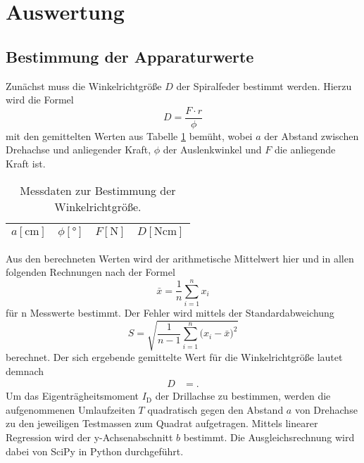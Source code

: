 \section{Auswertung}
\label{sec:Auswertung}

\subsection{Bestimmung der Apparaturwerte}

Zunächst muss die Winkelrichtgröße $D$ der Spiralfeder bestimmt werden.
Hierzu wird die Formel
\begin{equation}
  D = \frac{F \cdot r}{\phi}
\end{equation}
mit den gemittelten Werten aus Tabelle \ref{tab:1} bemüht, wobei $a$ der Abstand zwischen Drehachse und anliegender Kraft, $\phi$ der Auslenkwinkel und $F$ die anliegende Kraft ist.

\begin{table}[H]
  \centering
  \caption{Messdaten zur Bestimmung der Winkelrichtgröße.}
  \label{tab:1}
  \begin{tabular}{c c c c}
    \toprule
    {$a [\si{\centi\metre}]$} & {$\phi [\si{\degree}]$} & {$F [\si{\newton}]$} & {$D [\si{\newton\centi\metre}]$}\\
    \midrule
    
    \bottomrule
  \end{tabular}
\end{table}

Aus den berechneten Werten wird der arithmetische Mittelwert hier und in allen folgenden Rechnungen nach der Formel
\begin{equation}
  \bar{x} = \frac{1}{n} \sum_{i=1}^n x_i
\end{equation}
für n Messwerte bestimmt.
Der Fehler wird mittels der Standardabweichung
\begin{equation}
  S = \sqrt{ \frac{1}{n-1} \sum_{i=1}^n  \bigl(x_i - \bar{x} \bigr)^2  }
\end{equation}
berechnet.
Der sich ergebende gemittelte Wert für die Winkelrichtgröße lautet demnach
\begin{align*}
  D   &=   .
\end{align*}
Um das Eigenträgheitsmoment $I_{\text{D}}$ der Drillachse zu bestimmen, werden die aufgenommenen Umlaufzeiten $T$ quadratisch gegen den Abstand $a$ von Drehachse zu den jeweiligen Testmassen zum Quadrat aufgetragen.
Mittels linearer Regression wird der y-Achsenabschnitt $b$ bestimmt.
Die Ausgleichsrechnung wird dabei von SciPy in Python durchgeführt.

